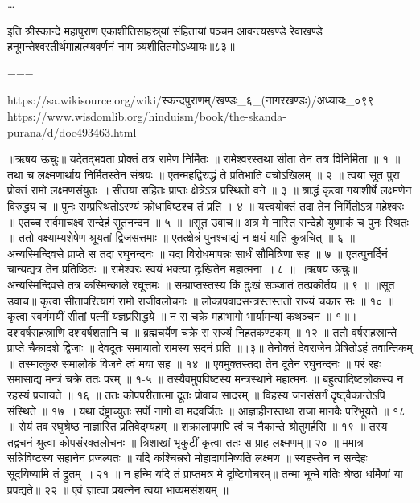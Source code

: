 \ldots

इति श्रीस्कान्दे महापुराण एकाशीतिसाहस्र्यां संहितायां पञ्चम आवन्त्यखण्डे रेवाखण्डे हनूमन्तेश्वरतीर्थमाहात्म्यवर्णनं नाम त्र्यशीतितमोऽध्यायः॥८३॥


===

https://sa.wikisource.org/wiki/स्कन्दपुराणम्/खण्डः_६_(नागरखण्डः)/अध्यायः_०९९
https://www.wisdomlib.org/hinduism/book/the-skanda-purana/d/doc493463.html

॥ऋषय ऊचुः॥
यदेतद्भवता प्रोक्तं तत्र रामेण निर्मितः ॥
रामेश्वरस्तथा सीता तेन तत्र विनिर्मिता ॥ १ ॥
तथा च लक्ष्मणार्थाय निर्मितस्तेन संश्रयः ॥
एतन्महद्विरुद्धं ते प्रतिभाति वचोऽखिलम् ॥ २ ॥
त्वया सूत पुरा प्रोक्तं रामो लक्ष्मणसंयुतः ॥
सीतया सहितः प्राप्तः क्षेत्रेऽत्र प्रस्थितो वने ॥ ३ ॥
श्राद्धं कृत्वा गयाशीर्षे लक्ष्मणेन विरुद्ध्य च ॥
पुनः सम्प्रस्थितोऽरण्यं क्रोधाविष्टश्च तं प्रति । ४ ॥
यत्त्वयोक्तं तदा तेन निर्मितोऽत्र महेश्वरः ॥
एतच्च सर्वमाचक्ष्व सन्देहं सूतनन्दन ॥ ५ ॥
॥सूत उवाच॥
अत्र मे नास्ति सन्देहो युष्माकं च पुनः स्थितः ॥
ततो वक्ष्याम्यशेषेण श्रूयतां द्विजसत्तमाः ॥
एतत्क्षेत्रं पुनश्चाद्यं न क्षयं याति कुत्रचित् ॥ ६ ॥
अन्यस्मिन्दिवसे प्राप्ते स तदा रघुनन्दनः ॥
यदा विरोधमापन्नः सार्धं सौमित्रिणा सह ॥ ७ ॥
एतत्पुनर्दिनं चान्यद्यत्र तेन प्रतिष्ठितः ॥
रामेश्वरः स्वयं भक्त्या दुःखितेन महात्मना ॥ ८ ॥
॥ऋषय ऊचुः॥
अन्यस्मिन्दिवसे तत्र कस्मिन्काले रघूत्तमः ॥
सम्प्राप्तस्तस्य किं दुःखं सञ्जातं तत्प्रकीर्तय ॥ ९ ॥
॥सूत उवाच॥
कृत्वा सीतापरित्यागं रामो राजीवलोचनः ॥
लोकापवादसन्त्रस्तस्ततो राज्यं चकार सः ॥ १० ॥
कृत्वा स्वर्णमयीं सीतां पत्नीं यज्ञप्रसिद्धये ॥
न स चक्रे महाभागो भार्यामन्यां कथञ्चन ॥ १॥।
दशवर्षसहस्राणि दशवर्षशतानि च ॥
ब्रह्मचर्येण चक्रे स राज्यं निहतकण्टकम् ॥ १२ ॥
ततो वर्षसहस्रान्ते प्राप्ते चैकादशे द्विजाः ॥
देवदूतः समायातो रामस्य सदनं प्रति ॥।३॥
तेनोक्तं देवराजेन प्रेषितोऽहं तवान्तिकम् ॥
तस्मात्कुरु समालोकं विजने त्वं मया सह ॥ १४ ॥
एवमुक्तस्तदा तेन दूतेन रघुनन्दनः ॥
परं रहः समासाद्य मन्त्रं चक्रे ततः परम् ॥ १-५ ॥
तस्यैवमुपविष्टस्य मन्त्रस्थाने महात्मनः ॥
बहुत्वादिष्टलोकस्य न रहस्यं प्रजायते ॥ १६ ॥
ततः कोपपरीतात्मा दूतः प्रोवाच सादरम् ॥
विहस्य जनसंसर्गं दृष्ट्वैकान्तेऽपि संस्थिते ॥ १७ ॥
यथा दंष्ट्राच्युतः सर्पो नागो वा मदवर्जितः ॥
आज्ञाहीनस्तथा राजा मानवैः परिभूयते ॥ १८ ॥
सेयं तव रघुश्रेष्ठ नाज्ञास्ति प्रतिवेद्म्यहम् ॥
शक्रालापमपि त्वं च नैकान्ते श्रोतुमर्हसि ॥ १९ ॥
तस्य तद्वचनं श्रुत्वा कोपसंरक्तलोचनः ॥
त्रिशाखां भृकुटीं कृत्वा ततः स प्राह लक्ष्मणम्॥ २० ॥
ममात्र सन्निविष्टस्य सहानेन प्रजल्पतः ॥
यदि कश्चिन्नरो मोहादागमिष्यति लक्ष्मण ॥
स्वहस्तेन न सन्देहः सूदयिष्यामि तं द्रुतम् ॥ २१ ॥
न हन्मि यदि तं प्राप्तमत्र मे दृष्टिगोचरम्॥
तन्मा भून्मे गतिः श्रेष्ठा धर्मिणां या प्रपद्यते॥ २२ ॥
एवं ज्ञात्वा प्रयत्नेन त्वया भाव्यमसंशयम् ॥
